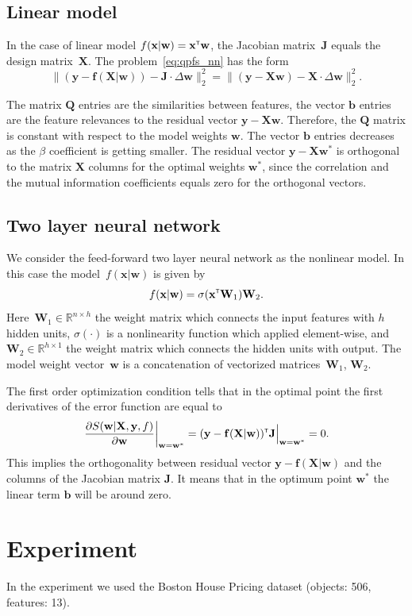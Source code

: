 \documentclass[a4paper,12pt]{article}
\theoremstyle{plain} %
\theoremstyle{definition} %
\theoremstyle{remark} %
\newcommand{\bb}{\mathbf{b}}
\newcommand{\bw}{\mathbf{w}}
\newcommand{\by}{\mathbf{y}}
\newcommand{\bx}{\mathbf{x}}
\newcommand{\bJ}{\mathbf{J}}
\newcommand{\bQ}{\mathbf{Q}}
\newcommand{\bbR}{\mathbb{R}}
\newcommand{\bW}{\mathbf{W}}
\newcommand{\bX}{\mathbf{X}}
\newcommand{\T}{{\text{\tiny\sffamily\upshape\mdseries T}}}
\begin{document}
  	\subsection*{Linear model}
  	In the case of linear model $f(\bx | \bw) = \bx^{\T} \bw$, the Jacobian matrix~$\bJ$ equals the design matrix~$\bX$. 
  	The problem~\ref{eq:qpfs_nn} has the form
  	\[
  		 \| (\by - \mathbf{f}(\bX | \bw)) - \bJ \cdot \Delta  \bw\|_2^2 = \| (\by - \bX \bw) - \bX \cdot \Delta  \bw\|_2^2.
  	\]
  	
  	The matrix $\bQ$ entries are the similarities between features, the vector $\bb$ entries are the feature relevances to the residual vector $\by - \bX \bw$. 
  	Therefore, the $\bQ$ matrix is constant with respect to the model weights $\bw$. 
  	The vector $\bb$ entries decreases as the $\beta$ coefficient is getting smaller. The residual vector $\by - \bX \bw^*$ is orthogonal to the matrix $\bX$ columns for the optimal weights $\bw^*$, since the correlation and the mutual information coefficients equals zero for the orthogonal vectors.
  	
  	\subsection*{Two layer neural network}
  	We consider the feed-forward two layer neural network as the nonlinear model. In this case the model~$f(\bx | \bw)$ is given by
  	\[
  		f(\bx | \bw) = \sigma(\bx^{\T} \bW_1) \bW_2.
  	\]
  	Here~$\bW_1 \in \bbR^{n \times h}$ the weight matrix which connects the input features with $h$ hidden units, $\sigma(\cdot)$ is a nonlinearity function which applied element-wise, and $\bW_2 \in \bbR^{h \times 1}$ the weight matrix which connects the hidden units with output. 
  	The model weight vector~$\bw$ is a concatenation of vectorized matrices~$\bW_1$, $\bW_2$.
  	
  	The first order optimization condition tells that in the optimal point the first derivatives of the error function are equal to
  	\[
  		\left.\frac{\partial S(\bw | \bX, \by, f)}{\partial \bw} \right|_{\bw = \bw^*}=  (\by - \mathbf{f}(\bX | \bw))^{\T} \mathbf{J}\Bigr|_{\bw=\bw^*} = 0.
  	\]
  	This implies the orthogonality between residual vector $\by - \mathbf{f}(\bX | \bw)$ and the columns of the Jacobian matrix $\bJ$. It means that in the optimum point $\bw^*$ the linear term $\bb$ will be around zero. 
  	
  	\section*{Experiment}
  	In the experiment we used the Boston House Pricing dataset (objects: 506, features: 13). 
  	
\end{document}
